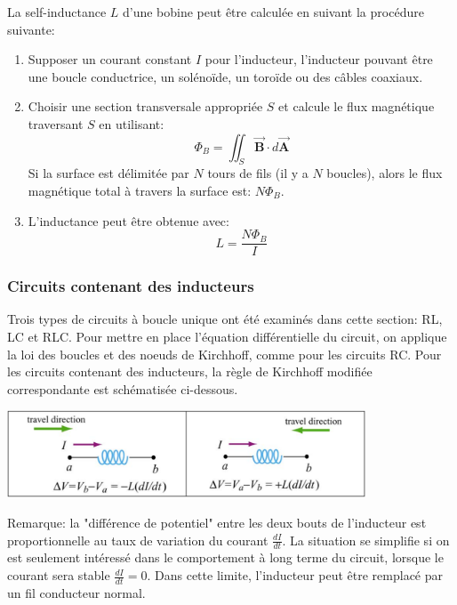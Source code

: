 \documentclass[a4paper]{article}
\begin{document}
La self-inductance $ L $ d'une bobine peut être calculée en suivant la procédure suivante: 
\begin{enumerate}
    \item Supposer un courant constant $ I $ pour l'inducteur, l'inducteur pouvant être une boucle conductrice, un solénoïde, un toroïde 
ou des câbles coaxiaux.
    \item Choisir une section transversale appropriée $ S $ et calcule le flux magnétique traversant $ S $ en utilisant: 
\[ \Phi_B = \iint_S \vec{\textbf{B}} \cdot d \vec{\textbf{A}} \]
Si la surface est délimitée par $ N $ tours de fils (il y a $ N $ boucles), alors le flux magnétique total à travers la surface est: $\displaystyle N \Phi_B $.
    \item L'inductance peut être obtenue avec: 
\[ L = \frac{N \Phi_B}{I} \]
\end{enumerate}








\subsubsection{Circuits contenant des inducteurs}







Trois types de circuits à boucle unique ont été examinés dans cette section: RL, LC et RLC. Pour mettre en place l'équation différentielle du circuit, on applique la loi des boucles et des noeuds de Kirchhoff, comme pour les circuits RC. Pour les circuits contenant des inducteurs, la règle de Kirchhoff modifiée correspondante est schématisée ci-dessous.
\begin{center}
\includegraphics[width=0.8\textwidth]{inductance.PNG}
\end{center}
Remarque: la "différence de potentiel" entre les deux bouts de l'inducteur est proportionnelle au taux de variation du courant $\displaystyle \frac{d I}{d t} $. La situation se simplifie si on est seulement intéressé dans le comportement à long terme du circuit, lorsque le courant sera stable $\displaystyle \frac{d I}{d t} = 0 $. Dans cette limite, l'inducteur peut être remplacé par un fil conducteur normal.
\end{document}
